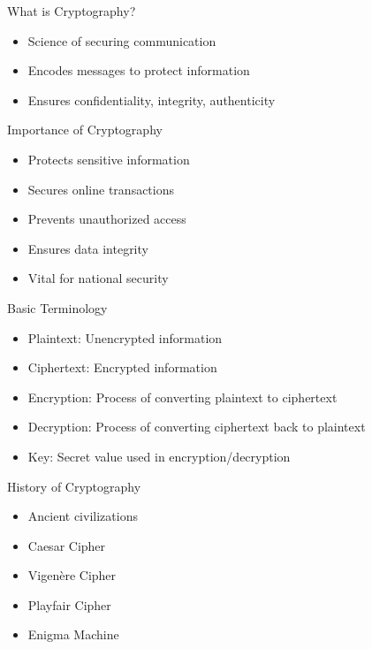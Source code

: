 \begin{withoutheadline}
\begin{frame}{What is Cryptography?}
\begin{itemize}
    \item Science of securing communication
    \item Encodes messages to protect information
    \item Ensures confidentiality, integrity, authenticity
\end{itemize}
\end{frame}

\begin{frame}{Importance of Cryptography}
\begin{itemize}
    \item Protects sensitive information
    \item Secures online transactions
    \item Prevents unauthorized access
    \item Ensures data integrity
    \item Vital for national security
\end{itemize}
\end{frame}

\begin{frame}{Basic Terminology}
\begin{itemize}
    \item Plaintext: Unencrypted information
    \item Ciphertext: Encrypted information
    \item Encryption: Process of converting plaintext to ciphertext
    \item Decryption: Process of converting ciphertext back to plaintext
    \item Key: Secret value used in encryption/decryption
\end{itemize}
\end{frame}

\begin{frame}{History of Cryptography}
\begin{itemize}
    \item Ancient civilizations
    \item Caesar Cipher
    \item Vigenère Cipher
    \item Playfair Cipher
    \item Enigma Machine
\end{itemize}
\end{frame}


\end{withoutheadline}
